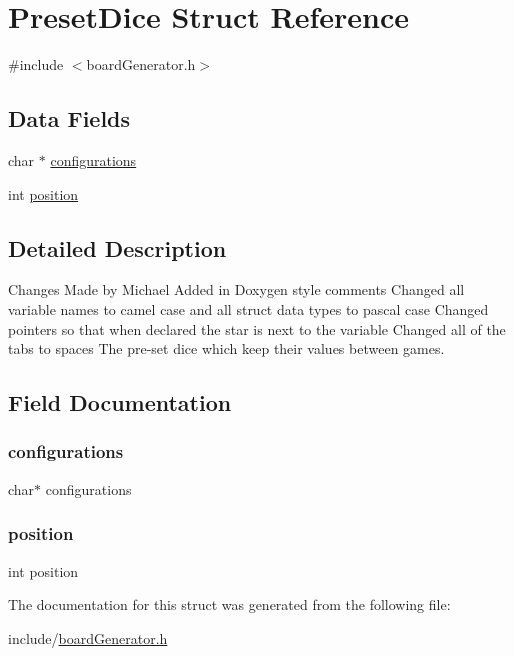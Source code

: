 \hypertarget{struct_preset_dice}{}\section{Preset\+Dice Struct Reference}
\label{struct_preset_dice}


{\ttfamily \#include $<$board\+Generator.\+h$>$}

\subsection*{Data Fields}
\begin{DoxyCompactItemize}
\item 
char $\ast$ \hyperlink{struct_preset_dice_aebc0cd5c3c8375c4c0eded599f607e7f}{configurations}
\item 
int \hyperlink{struct_preset_dice_a401e942526aac47cef94f478182486e7}{position}
\end{DoxyCompactItemize}


\subsection{Detailed Description}
Changes Made by Michael Added in Doxygen style comments Changed all variable names to camel case and all struct data types to pascal case Changed pointers so that when declared the star is next to the variable Changed all of the tabs to spaces The pre-\/set dice which keep their values between games. 

\subsection{Field Documentation}
\mbox{\label{struct_preset_dice_aebc0cd5c3c8375c4c0eded599f607e7f}} 
\subsubsection{\texorpdfstring{configurations}{configurations}}
{\footnotesize\ttfamily char$\ast$ configurations}

\mbox{\label{struct_preset_dice_a401e942526aac47cef94f478182486e7}} 
\subsubsection{\texorpdfstring{position}{position}}
{\footnotesize\ttfamily int position}



The documentation for this struct was generated from the following file\+:\begin{DoxyCompactItemize}
\item 
include/\hyperlink{board_generator_8h}{board\+Generator.\+h}\end{DoxyCompactItemize}
